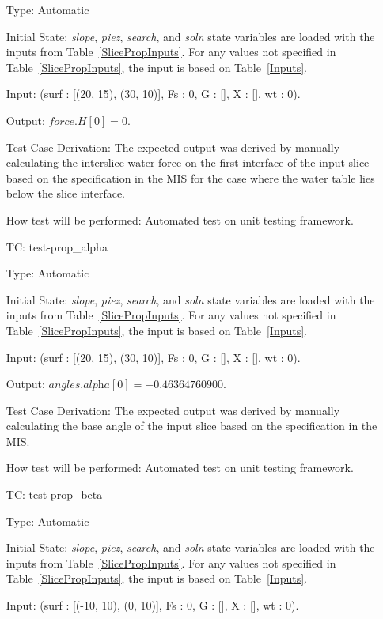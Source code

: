 \documentclass[12pt, titlepage]{article}
\newcounter{utestnum} %
\begin{document}
\begin{enumerate}[label=TC\arabic*:,ref={\arabic*}]
	Type: Automatic
	
	Initial State: \textit{slope}, \textit{piez}, \textit{search}, and 
	\textit{soln} state variables are loaded with the inputs from 
	Table~\ref{SlicePropInputs}. For any values not specified in 
	Table~\ref{SlicePropInputs}, the input is based on Table~\ref{Inputs}.
	
	Input: (surf : [(20, 15), (30, 10)], Fs : 0, G : [], X : [], wt : 
	0).
	
	Output: $\textit{force.H}[0] = 0$.
	
	Test Case Derivation: The expected output was derived by manually 
	calculating the interslice water force on the first interface of the input 
	slice based on the specification in the MIS for the case where the water 
	table lies below the slice interface.
	
	How test will be performed: Automated test on unit testing framework.
	
	\item [TC\refstepcounter{utestnum}\theutestnum: 
	\label{TC_PropertyAlpha}] 
	test-prop\_alpha
	
	Type: Automatic
	
	Initial State: \textit{slope}, \textit{piez}, \textit{search}, and 
	\textit{soln} state variables are loaded with the inputs from 
	Table~\ref{SlicePropInputs}. For any values not specified in 
	Table~\ref{SlicePropInputs}, the input is based on Table~\ref{Inputs}.
	
	Input: (surf : [(20, 15), (30, 10)], Fs : 0, G : [], X : [], wt : 
	0).
	
	Output: $\textit{angles.alpha}[0] = -0.46364760900$.
	
	Test Case Derivation: The expected output was derived by manually 
	calculating the base angle of the input slice based on the specification in 
	the MIS.
	
	How test will be performed: Automated test on unit testing framework.
	
	\item [TC\refstepcounter{utestnum}\theutestnum: 
	\label{TC_PropertyBeta}] 
	test-prop\_beta
	
	Type: Automatic
	
	Initial State: \textit{slope}, \textit{piez}, \textit{search}, and 
	\textit{soln} state variables are loaded with the inputs from 
	Table~\ref{SlicePropInputs}. For any values not specified in 
	Table~\ref{SlicePropInputs}, the input is based on Table~\ref{Inputs}.
	
	Input: (surf : [(-10, 10), (0, 10)], Fs : 0, G : [], X : [], wt : 
	0).
	

\end{enumerate}
\end{document}
